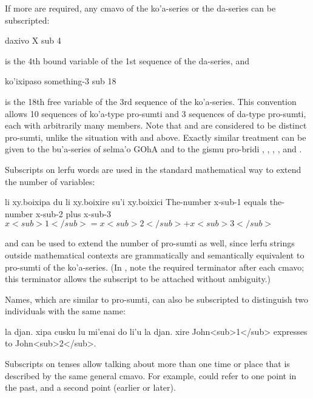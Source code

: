 If more are required, any cmavo of the ko'a-series or the
    da-series can be subscripted:
\begin{example}
daxivo\n
X sub 4
\end{example}

{\noindent}is the 4th bound variable of the 1st sequence of the da-series,
    and
\begin{example}
ko'ixipaso\n
something-3 sub 18
\end{example}

{\noindent}is the 18th free variable of the 3rd sequence of the
    ko'a-series. This convention allows 10 sequences of ko'a-type
    pro-sumti and 3 sequences of da-type pro-sumti, each with
    arbitrarily many members. Note that  and 
    are considered to be distinct pro-sumti, unlike the situation
    with  and  above. Exactly similar treatment
    can be given to the bu'a-series of selma'o GOhA and to the
    gismu pro-bridi , , , , and
    . 

Subscripts on lerfu words are used in the standard
    mathematical way to extend the number of variables:
\begin{example}
li xy.boixipa du li xy.boixire su'i xy.boixici\n
The-number x-sub-1 equals the-number x-sub-2 plus x-sub-3\n
$x<sub>1</sub>  = x<sub>2</sub>  + x<sub>3</sub>$
\end{example}

{\noindent}and can be used to extend the number of pro-sumti as well,
    since lerfu strings outside mathematical contexts are
    grammatically and semantically equivalent to pro-sumti of the
    ko'a-series. (In , note the
    required terminator  after each  cmavo; this
    terminator allows the subscript to be attached without
    ambiguity.) 

Names, which are similar to pro-sumti, can also be
    subscripted to distinguish two individuals with the same
    name:
\begin{example}
la djan. xipa cusku lu mi'enai do li'u la djan. xire\n
John<sub>1</sub> expresses  to John<sub>2</sub>.
\end{example}

Subscripts on tenses allow talking about more than one time or
    place that is described by the same general cmavo. For example,
     could refer to one point in the past, and 
    a second point (earlier or later). 

